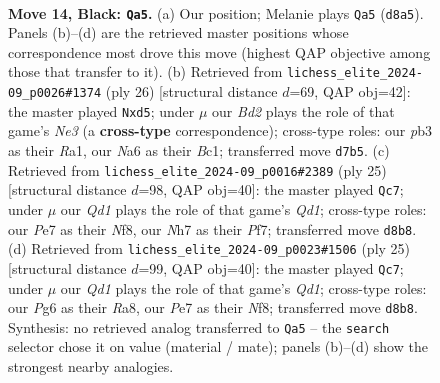 \documentclass[11pt]{article}
\begin{document}
\clearpage

\begin{figure}[p]\centering
\begin{subfigure}{0.46\textwidth}\centering
\resizebox{\linewidth}{!}{%
\newchessgame
\chessboard[
  setfen={r2qkb1r/pp1bpp1n/n2p2p1/1N5p/4P3/1PNBBP2/P1P2QPP/2K1R2R b kq - 0 14},
  showmover=false,
  pgfstyle=straightmove, color=movearrow, markmove={d8-a5}
]}
\caption{}
\end{subfigure}\hfill
\begin{subfigure}{0.46\textwidth}\centering
\resizebox{\linewidth}{!}{%
\newchessgame
\chessboard[
  setfen={r2qr1k1/2p2pb1/1pn1b1pp/p2np3/8/2PPN1P1/PP1N1PBP/R1BQR1K1 w - - 2 14},
  showmover=false,
  pgfstyle=straightmove, color=movearrow, markmove={e3-d5}
]}
\caption{}
\end{subfigure}
\\[4pt]
\begin{subfigure}{0.46\textwidth}\centering
\resizebox{\linewidth}{!}{%
\newchessgame
\chessboard[
  setfen={r2qrnk1/pp3pp1/2pbbp1p/8/3P1N2/2PBB2P/PPQ2PP1/R4RK1 b - - 6 13},
  showmover=false,
  pgfstyle=straightmove, color=movearrow, markmove={d8-c7}
]}
\caption{}
\end{subfigure}\hfill
\begin{subfigure}{0.46\textwidth}\centering
\resizebox{\linewidth}{!}{%
\newchessgame
\chessboard[
  setfen={r2qrnk1/pp3pp1/2pbbp1p/8/3P1N2/2PB3P/PPQB1PP1/R4RK1 b - - 2 13},
  showmover=false,
  pgfstyle=straightmove, color=movearrow, markmove={d8-c7}
]}
\caption{}
\end{subfigure}
\caption{\textbf{Move 14, Black: \texttt{Qa5}.} (a) Our position; Melanie plays \texttt{Qa5} (\texttt{d8a5}). Panels (b)--(d) are the retrieved master positions whose correspondence most drove this move (highest QAP objective among those that transfer to it). (b) Retrieved from \texttt{lichess\_elite\_2024-09\_p0026\#1374} (ply 26) [structural distance $d$=69, QAP obj=42]: the master played \texttt{Nxd5}; under $\mu$ our \emph{Bd2} plays the role of that game's \emph{Ne3} (a \textbf{cross-type} correspondence); cross-type roles: our \emph{p}b3 as their \emph{R}a1, our \emph{N}a6 as their \emph{B}c1; transferred move \texttt{d7b5}. (c) Retrieved from \texttt{lichess\_elite\_2024-09\_p0016\#2389} (ply 25) [structural distance $d$=98, QAP obj=40]: the master played \texttt{Qc7}; under $\mu$ our \emph{Qd1} plays the role of that game's \emph{Qd1}; cross-type roles: our \emph{P}e7 as their \emph{N}f8, our \emph{N}h7 as their \emph{P}f7; transferred move \texttt{d8b8}. (d) Retrieved from \texttt{lichess\_elite\_2024-09\_p0023\#1506} (ply 25) [structural distance $d$=99, QAP obj=40]: the master played \texttt{Qc7}; under $\mu$ our \emph{Qd1} plays the role of that game's \emph{Qd1}; cross-type roles: our \emph{P}g6 as their \emph{R}a8, our \emph{P}e7 as their \emph{N}f8; transferred move \texttt{d8b8}. Synthesis: no retrieved analog transferred to \texttt{Qa5} -- the \texttt{search} selector chose it on value (material / mate); panels (b)--(d) show the strongest nearby analogies.}
\label{fig:thought-m27}
\end{figure}
\end{document}
